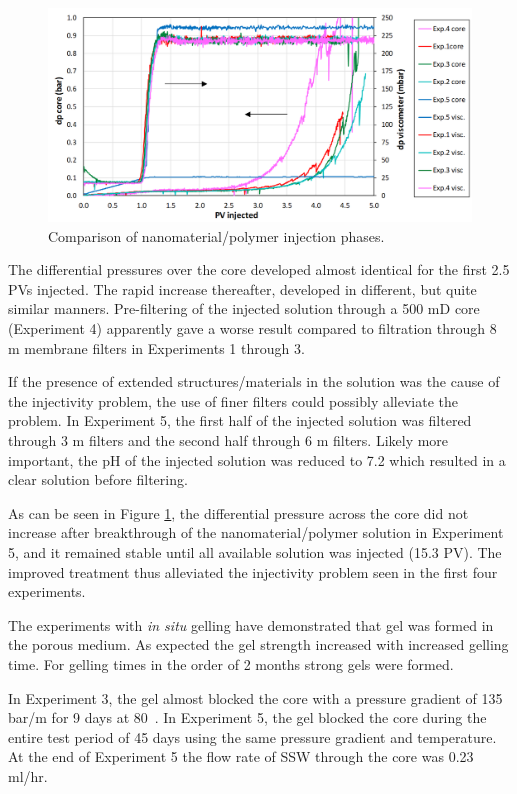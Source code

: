 \documentclass[energies,article,submit,moreauthors,pdftex]{Definitions/mdpi}
\begin{document}
\begin{figure}[h!]
    \centering
    \includegraphics[width=.8\textwidth]{fig/gelexp_sum.png}
    \caption{Comparison of nanomaterial/polymer injection phases.}
    \label{cht:gelexp_sum} %
\end{figure}
 
The differential pressures over the core developed almost identical for the first 2.5 PVs injected. The rapid increase thereafter, developed in different, but quite similar manners. Pre-filtering of the injected solution through a 500 mD core (Experiment 4) apparently gave a worse result compared to filtration through 8 \micro m membrane filters in Experiments 1 through 3.

If the presence of extended structures/materials in the solution was the cause of the injectivity problem, the use of finer filters could possibly alleviate the problem. In Experiment 5, the first half of the injected solution was filtered through 3 \micro m filters and the second half through 6 \micro m filters. Likely more important, the pH of the injected solution was reduced to 7.2 which resulted in a clear solution before filtering. 

As can be seen in Figure \ref{cht:gelexp_sum}, the differential pressure across the core did not increase after breakthrough of the nanomaterial/polymer solution in Experiment 5, and it remained stable until all available solution was injected (15.3 PV). The improved treatment thus alleviated the injectivity problem seen in the first four experiments.

The experiments with \textit{in situ} gelling have demonstrated that gel was formed in the porous medium. As expected the gel strength increased with increased gelling time. For gelling times in the order of 2 months strong gels were formed. 

In Experiment 3, the gel almost blocked the core with a pressure gradient of 135 bar/m for 9 days at 80~\celsius. In Experiment 5, the gel blocked the core during the entire test period of 45 days using the same pressure gradient and temperature. At the end of Experiment 5 the flow rate of SSW through the core was 0.23 ml/hr. 
\end{document}

